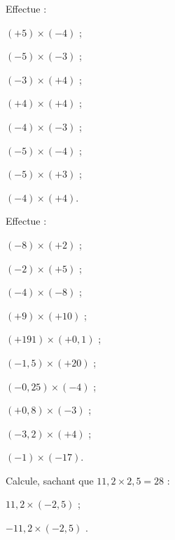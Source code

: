 \begin{exercice}
Effectue :
\begin{colenumerate}{2}
 \item $(+5) \times (-4)$ \dotfill;
 \item $(-5) \times (-3)$ \dotfill;
 \item $(-3) \times (+4)$ \dotfill;
 \item $(+4) \times (+4)$ \dotfill;
 \item $(-4) \times (-3)$ \dotfill;
 \item $(-5) \times (-4)$ \dotfill;
 \item $(-5) \times (+3)$ \dotfill;
 \item $(-4) \times (+4)$\dotfill.
 \end{colenumerate}
\end{exercice}


\begin{exercice}
Effectue :
\begin{colenumerate}{2}
 \item $(-8) \times (+2)$ \dotfill;
 \item $(-2) \times (+5) $ \dotfill;
 \item $(-4) \times (-8)$ \dotfill;
 \item $(+9) \times (+10)$ \dotfill; 
 \item $(+191) \times (+0,1)$ \dotfill; 
 \item $(-1,5) \times (+20)$ \dotfill;
 \item $(-0,25) \times (-4)$ \dotfill;
 \item $(+0,8) \times (-3)$ \dotfill;
 \item $(-3,2) \times (+4)$ \dotfill;
 \item \phantom{.} $(-1) \times (-17)$\dotfill.
 \end{colenumerate}
\end{exercice}


\begin{exercice}
Calcule, sachant que $11,2 \times 2,5 = 28$ :
\begin{colenumerate}{2}
 \item $11,2 \times (-2,5)$  \dotfill;
 \item $-11,2 \times (-2,5)$ \dotfill.
 \end{colenumerate}
\end{exercice}

\columnbreak

